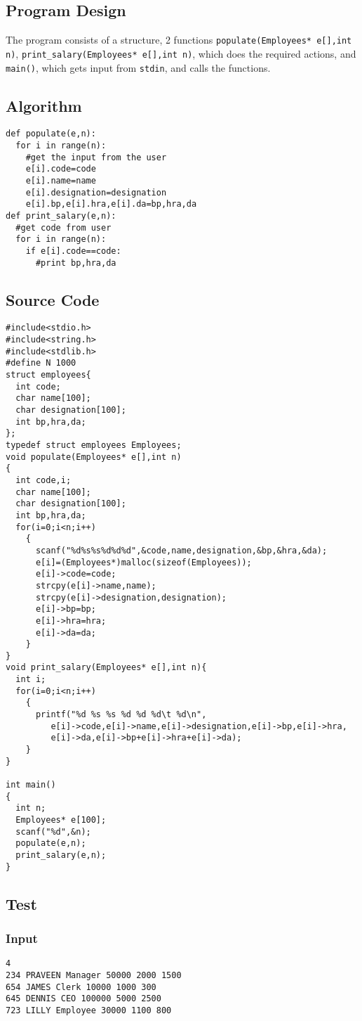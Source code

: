 \documentclass[11pt]{article}
\begin{document}
\subsection*{Program Design}
\label{sec-1-3}
The program consists of a structure, 2 functions \texttt{populate(Employees* e[],int n)},
\texttt{print\_salary(Employees* e[],int n)}, which does the required actions,
and \texttt{main()}, which gets input from \texttt{stdin}, and calls the functions.
\subsection*{Algorithm}
\label{sec-1-4}
\begin{verbatim}
def populate(e,n):
  for i in range(n):
    #get the input from the user
    e[i].code=code
    e[i].name=name
    e[i].designation=designation
    e[i].bp,e[i].hra,e[i].da=bp,hra,da
def print_salary(e,n):
  #get code from user
  for i in range(n):
    if e[i].code==code:
      #print bp,hra,da
\end{verbatim}
\subsection*{Source Code}
\label{sec-1-5}
\begin{verbatim}
#include<stdio.h>
#include<string.h>
#include<stdlib.h>
#define N 1000
struct employees{
  int code;
  char name[100];
  char designation[100];
  int bp,hra,da;
};
typedef struct employees Employees;
void populate(Employees* e[],int n)
{
  int code,i;
  char name[100];
  char designation[100];
  int bp,hra,da;
  for(i=0;i<n;i++)
    {
      scanf("%d%s%s%d%d%d",&code,name,designation,&bp,&hra,&da);
      e[i]=(Employees*)malloc(sizeof(Employees));
      e[i]->code=code;
      strcpy(e[i]->name,name);
      strcpy(e[i]->designation,designation);
      e[i]->bp=bp;
      e[i]->hra=hra;
      e[i]->da=da;
    }  
}
void print_salary(Employees* e[],int n){
  int i;
  for(i=0;i<n;i++)
    {
      printf("%d %s %s %d %d %d\t %d\n",
	     e[i]->code,e[i]->name,e[i]->designation,e[i]->bp,e[i]->hra,
	     e[i]->da,e[i]->bp+e[i]->hra+e[i]->da);
    }
}

int main()
{
  int n;
  Employees* e[100];
  scanf("%d",&n);
  populate(e,n);
  print_salary(e,n);
}
\end{verbatim}
\subsection*{Test}
\label{sec-1-6}
\subsubsection*{Input}
\label{sec-1-6-1}
\begin{verbatim}
4
234 PRAVEEN Manager 50000 2000 1500
654 JAMES Clerk 10000 1000 300
645 DENNIS CEO 100000 5000 2500
723 LILLY Employee 30000 1100 800
\end{verbatim}
\end{document}
